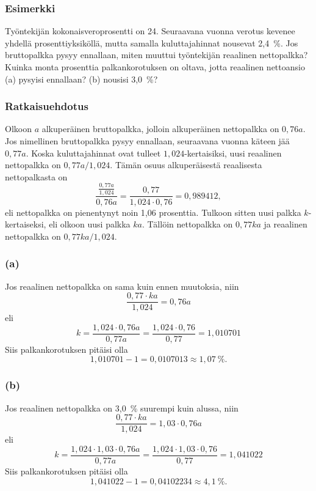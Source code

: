 \documentclass[]{beamer}\usepackage[]{graphicx}\usepackage[]{color}
\theoremstyle{remark}
\begin{document}
	\begin{frame}[shrink]
		\frametitle{Esimerkki}
			Työntekijän kokonaisveroprosentti on 24. Seuraavana vuonna verotus kevenee yhdellä prosenttiyksiköllä, mutta samalla kuluttajahinnat nousevat 2,4~\%. Jos bruttopalkka pysyy ennallaan, miten muuttui työntekijän reaalinen nettopalkka? Kuinka monta prosenttia 
			palkankorotuksen on oltava, jotta reaalinen nettoansio (a) pysyisi ennallaan? (b) nousisi 3,0~\%?
		\end{frame}

		\begin{frame}
			\frametitle{Ratkaisuehdotus}
			Olkoon \(a\) alkuperäinen bruttopalkka, jolloin alkuperäinen nettopalkka on \(0,76a\). \pause Jos nimellinen bruttopalkka pysyy ennallaan, seuraavana vuonna käteen jää \(0,77a\). Koska kuluttajahinnat ovat tulleet \(1,024\)-kertaisiksi, uusi reaalinen nettopalkka on \(0,77a/1,024\). Tämän osuus alkuperäisestä reaalisesta nettopalkasta on
			\[
				\frac{\frac{0,77a}{1,024}}{0,76a} = \frac{0,77}{1,024\cdot0,76} = 0{,}989412,
			\]
			eli nettopalkka on pienentynyt noin 1{,}06 prosenttia.
			Tulkoon sitten uusi palkka \(k\)-kertaiseksi, eli olkoon uusi palkka \(ka\). Tällöin nettopalkka on \(0,77ka\) ja reaalinen nettopalkka on \(0,77ka/1,024\).
		\end{frame}

		\begin{frame}
			\frametitle{(a)}
			Jos  reaalinen nettopalkka on sama kuin ennen muutoksia, niin
			\[
				\frac{0,77\cdot ka}{1,024} = 0,76a
			\]
			eli
			\[
				k = \frac{1,024 \cdot 0,76a}{0,77a} = \frac{1,024\cdot0,76}{0,77} = 1{,}010701
			\]
			Siis palkankorotuksen pitäisi olla 
			\[
				1{,}010701 - 1 = 0{,}0107013 \approx 1{,}07~\%.
			\]
		\end{frame}

		\begin{frame}
			\frametitle{(b)}
			Jos reaalinen nettopalkka on 3,0~\% suurempi kuin alussa, niin
			\[
				\frac{0,77\cdot ka}{1,024} = 1,03\cdot0,76a
			\]
			eli
			\[
				k = \frac{1,024 \cdot 1,03\cdot 0,76a}{0,77a} = \frac{1,024\cdot1,03\cdot 0,76}{0,77} = 1{,}041022
			\]
			Siis palkankorotuksen pitäisi olla 
			\[
				1{,}041022 - 1 = 0{,}04102234 \approx 4{,}1~\%.
			\]
		\end{frame}
\end{document}
